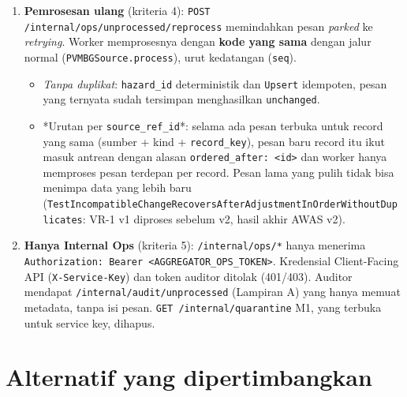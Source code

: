 \begin{enumerate}
\item \textbf{Pemrosesan ulang} (kriteria 4): \texttt{POST /\allowbreak{}internal/\allowbreak{}ops/\allowbreak{}unprocessed/\allowbreak{}reprocess} memindahkan pesan \emph{parked} ke \emph{retrying}. Worker memprosesnya dengan \textbf{kode yang sama} dengan jalur normal (\texttt{PVMBGSource.\allowbreak{}process}), urut kedatangan (\texttt{seq}).
\begin{itemize}
\item \emph{Tanpa duplikat}: \texttt{hazard\_\allowbreak{}id} deterministik dan \texttt{Upsert} idempoten, pesan yang ternyata sudah tersimpan menghasilkan \texttt{unchanged}.
\item *Urutan per \texttt{source\_\allowbreak{}ref\_\allowbreak{}id}*: selama ada pesan terbuka untuk record yang sama (sumber + kind + \texttt{record\_\allowbreak{}key}), pesan baru record itu ikut masuk antrean dengan alasan \texttt{ordered\_\allowbreak{}after: <id>} dan worker hanya memproses pesan terdepan per record. Pesan lama yang pulih tidak bisa menimpa data yang lebih baru (\texttt{Test\allowbreak{}Incompatible\allowbreak{}Change\allowbreak{}Recovers\allowbreak{}After\allowbreak{}Adjustment\allowbreak{}In\allowbreak{}Order\allowbreak{}Without\allowbreak{}Duplicates}: VR-1 v1 diproses sebelum v2, hasil akhir AWAS v2).
\end{itemize}
\item \textbf{Hanya Internal Ops} (kriteria 5): \texttt{/\allowbreak{}internal/\allowbreak{}ops/\allowbreak{}*} hanya menerima \texttt{Authorization: Bearer <AGGREGATOR\_\allowbreak{}OPS\_\allowbreak{}TOKEN>}. Kredensial Client-Facing API (\texttt{X-\allowbreak{}Service-\allowbreak{}Key}) dan token auditor ditolak (401/403). Auditor mendapat \texttt{/\allowbreak{}internal/\allowbreak{}audit/\allowbreak{}unprocessed} (Lampiran A) yang hanya memuat metadata, tanpa isi pesan. \texttt{GET /\allowbreak{}internal/\allowbreak{}quarantine} M1, yang terbuka untuk service key, dihapus.
\end{enumerate}

\section{Alternatif yang dipertimbangkan}

